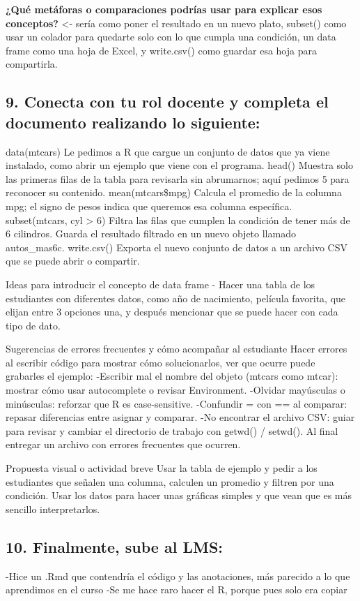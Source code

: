 \documentclass[
]{article}
\begin{document}
\textbf{¿Qué metáforas o comparaciones podrías usar para explicar esos
conceptos?} \textless- sería como poner el resultado en un nuevo plato,
subset() como usar un colador para quedarte solo con lo que cumpla una
condición, un data frame como una hoja de Excel, y write.csv() como
guardar esa hoja para compartirla.

\subsection{9. Conecta con tu rol docente y completa el documento
realizando lo
siguiente:}\label{conecta-con-tu-rol-docente-y-completa-el-documento-realizando-lo-siguiente}

data(mtcars) Le pedimos a R que cargue un conjunto de datos que ya viene
instalado, como abrir un ejemplo que viene con el programa. head()
Muestra solo las primeras filas de la tabla para revisarla sin
abrumarnos; aquí pedimos 5 para reconocer su contenido.
mean(mtcars\$mpg) Calcula el promedio de la columna mpg; el signo de
pesos indica que queremos esa columna específica. subset(mtcars, cyl
\textgreater{} 6) Filtra las filas que cumplen la condición de tener más
de 6 cilindros. Guarda el resultado filtrado en un nuevo objeto llamado
autos\_mas6c. write.csv() Exporta el nuevo conjunto de datos a un
archivo CSV que se puede abrir o compartir.

Ideas para introducir el concepto de data frame - Hacer una tabla de los
estudiantes con diferentes datos, como año de nacimiento, película
favorita, que elijan entre 3 opciones una, y después mencionar que se
puede hacer con cada tipo de dato.

Sugerencias de errores frecuentes y cómo acompañar al estudiante Hacer
errores al escribir código para mostrar cómo solucionarlos, ver que
ocurre puede grabarles el ejemplo: -Escribir mal el nombre del objeto
(mtcars como mtcar): mostrar cómo usar autocomplete o revisar
Environment. -Olvidar mayúsculas o minúsculas: reforzar que R es
case-sensitive. -Confundir = con == al comparar: repasar diferencias
entre asignar y comparar. -No encontrar el archivo CSV: guiar para
revisar y cambiar el directorio de trabajo con getwd() / setwd(). Al
final entregar un archivo con errores frecuentes que ocurren.

Propuesta visual o actividad breve Usar la tabla de ejemplo y pedir a
los estudiantes que señalen una columna, calculen un promedio y filtren
por una condición. Usar los datos para hacer unas gráficas simples y que
vean que es más sencillo interpretarlos.

\subsection{10. Finalmente, sube al LMS:}\label{finalmente-sube-al-lms}

-Hice un .Rmd que contendría el código y las anotaciones, más parecido a
lo que aprendimos en el curso -Se me hace raro hacer el R, porque pues
solo era copiar
\end{document}
